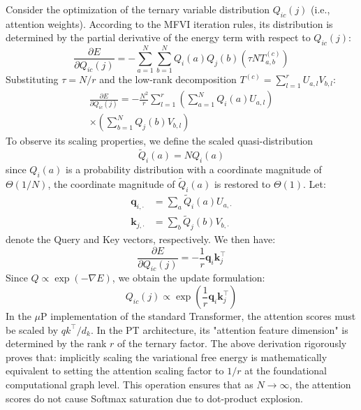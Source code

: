 \documentclass[11pt]{article}
\begin{document}
Consider the optimization of the ternary variable distribution $Q_{ic}(j)$ (i.e., attention weights). According to the MFVI iteration rules, its distribution is determined by the partial derivative of the energy term with respect to $Q_{ic}(j)$:
\begin{equation}
\frac{\partial E}{\partial Q_{ic}(j)} = -\sum_{a=1}^N \sum_{b=1}^N Q_i(a) Q_j(b) (\tau N T_{a,b}^{(c)})
\end{equation}
Substituting $\tau = N/r$ and the low-rank decomposition $T^{(c)} = \sum_{l=1}^r U_{a,l} V_{b,l}$:
\begin{equation}
\begin{split}
\frac{\partial E}{\partial Q_{ic}(j)} = -\frac{N^2}{r} \sum_{l=1}^r \left( \sum_{a=1}^N Q_i(a) U_{a,l} \right) \\
\times \left( \sum_{b=1}^N Q_j(b) V_{b,l} \right)
\end{split}
\end{equation}
To observe its scaling properties, we define the scaled quasi-distribution
\begin{equation}
    \tilde{Q}_i(a) = N Q_i(a) 
\end{equation}
since $Q_i(a)$ is a probability distribution with a coordinate magnitude of $\Theta(1/N)$, the coordinate magnitude of $\tilde{Q}_i(a)$ is restored to $\Theta(1)$. Let:
\begin{equation}
\begin{split}
\boldsymbol{q}_{i, \cdot} &= \sum_a \tilde{Q}_i(a) U_{a, \cdot} \\
\boldsymbol{k}_{j, \cdot} &= \sum_b \tilde{Q}_j(b) V_{b, \cdot}
\end{split}
\end{equation}
denote the Query and Key vectors, respectively. We then have:
\begin{equation}
\frac{\partial E}{\partial Q_{ic}(j)} = -\frac{1}{r} \boldsymbol{q}_i \boldsymbol{k}_j^\top
\end{equation}
Since $Q \propto \exp(-\nabla E)$, we obtain the update formulation:
\begin{equation}
Q_{ic}(j) \propto \exp \left( \frac{1}{r} \boldsymbol{q}_i \boldsymbol{k}_j^\top \right)
\end{equation}
In the $\mu$P implementation of the standard Transformer, the attention scores must be scaled by $qk^\top/d_k$. In the PT architecture, its "attention feature dimension" is determined by the rank $r$ of the ternary factor. The above derivation rigorously proves that: implicitly scaling the variational free energy is mathematically equivalent to setting the attention scaling factor to $1/r$ at the foundational computational graph level. This operation ensures that as $N \to \infty$, the attention scores do not cause Softmax saturation due to dot-product explosion.
\end{document}
